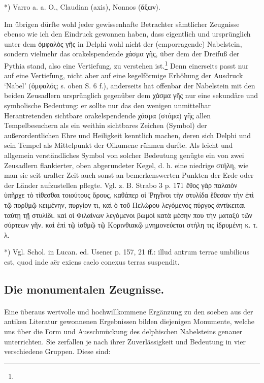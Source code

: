 \documentclass[a4paper, 11pt, oneside]{article}
\begin{document}
*) Varro a. a. O., Claudian (axis), Nonnos (ἄξων).

Im übrigen dürfte wohl jeder gewissenhafte Betrachter sämtlicher Zeugnisse ebenso wie ich den Eindruck gewonnen haben, dass eigentlich und ursprünglich unter dem ὀμφαλὸς γῆς in Delphi wohl nicht der (emporragende) Nabelstein, sondern vielmehr das orakelspendende χάσμα γῆς, über dem der Dreifuß der Pythia stand, also eine Vertiefung, zu verstehen ist.\footnote{} Denn einerseits passt nur auf eine Vertiefung, nicht aber auf eine kegelförmige Erhöhung der Ausdruck `Nabel' (ὀμφαλός; s. oben S. 6 f.), anderseits hat offenbar der Nabelstein mit den beiden Zeusadlern ursprünglich gegenüber dem χάσμα γῆς nur eine sekundäre und symbolische Bedeutung: er sollte nur das den wenigen unmittelbar Herantretenden sichtbare orakelspendende χάσμα (στόμα) γῆς allen Tempelbesuchern als ein weithin sichtbares Zeichen (Symbol) der außerordentlichen Ehre und Heiligkeit kenntlich machen, deren sich Delphi und sein Tempel als Mittelpunkt der Oikumene rühmen durfte. Als leicht und allgemein verständliches Symbol von solcher Bedeutung genügte ein von zwei Zeusadlern flankierter, oben abgerundeter Kegel, d. h. eine niedrige στήλη, wie man sie seit uralter Zeit auch sonst an bemerkenswerten Punkten der Erde oder der Länder aufzustellen pflegte. Vgl. z. B. Strabo 3 p. 171 ἔθος γὰρ παλαιὸν ὑπῆρχε τὸ τίθεσθαι τοιούτους ὅρους, καθάπερ οἱ Ῥηγῖνοι τὴν στυλίδα ἔθεσαν τὴν ἐπὶ τῷ πορθμῷ κειμένην, πυργίον τι, καὶ ὁ τοῦ Πελώρου λεγόμενος πύργος ἀντίκειται ταύτῃ τῇ στυλίδι. καὶ οἱ Φιλαίνων λεγόμενοι βωμοὶ κατὰ μέσην που τὴν ματαξὺ τῶν σύρτεων γῆν. καὶ ἐπὶ τῷ ἰσθμῷ τῷ Κορινθιακῷ μνημονεύεται στήλη τις ἱδρυμένη κ. τ. λ.

*) Vgl. Schol. in Lucan. ed. Usener p. 157, 21 ff.: illud antrum terrae umbilicus est, quod inde aër exiens caelo conexus terras suspendit.

\subsection{Die monumentalen Zeugnisse.}
\paragraph{}
Eine überaus wertvolle und hochwillkommene Ergänzung zu den soeben aus der antiken Literatur gewonnenen Ergebnissen bilden diejenigen Monumente, welche uns über die Form und Ausschmückung des delphischen Nabelsteins genauer unterrichten. Sie zerfallen je nach ihrer Zuverlässigkeit und Bedeutung in vier verschiedene Gruppen. Diese sind:
\end{document}
